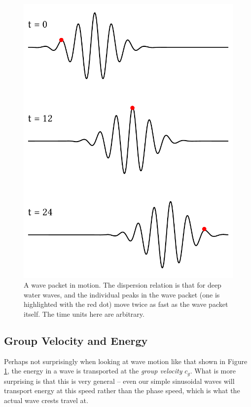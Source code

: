 \begin{figure}
\centering\includegraphics[width=0.6\linewidth]{Figures/Chapter5/fig_wave_packet_motion}
\caption{A wave packet in motion.  The dispersion relation is that for deep water waves, and the individual peaks in the wave packet (one is highlighted with the red dot) move twice as fast as the wave packet itself. The time units here are arbitrary.}
\label{fig_wave_packet_motion}
\end{figure}


\subsection{Group Velocity and Energy}

Perhaps not surprisingly when looking at wave motion like that shown in Figure \ref{fig_wave_packet_motion}, the energy in a wave is transported at the \emph{group velocity} $c_g$.  What is more surprising is that this is very general -- even our simple sinusoidal waves will transport energy at this speed rather than the phase speed, which is what the actual wave crests travel at.


